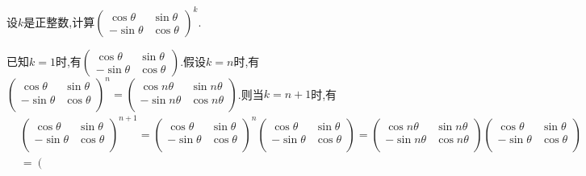 \documentclass[../../main.tex]{subfiles}
\begin{document}
\begin{exercise}
设\(k\)是正整数,计算\(\begin{pmatrix}
\cos\theta & \sin\theta\\
-\sin\theta & \cos\theta
\end{pmatrix}^k\).
\end{exercise}
\begin{solution}
已知$k=1$时,有\(\begin{pmatrix}
\cos\theta & \sin\theta\\
-\sin\theta & \cos\theta
\end{pmatrix}\).假设$k=n$时,有$\left( \begin{matrix}
\cos \theta&		\sin \theta\\
-\sin \theta&		\cos \theta\\
\end{matrix} \right) ^n=\left( \begin{matrix}
\cos n\theta&		\sin n\theta\\
-\sin n\theta&		\cos n\theta\\
\end{matrix} \right) $.则当$k=n+1$时,有
\begin{align*}
&\left( \begin{matrix}
\cos \theta&		\sin \theta\\
-\sin \theta&		\cos \theta\\
\end{matrix} \right) ^{n+1}=\left( \begin{matrix}
\cos \theta&		\sin \theta\\
-\sin \theta&		\cos \theta\\
\end{matrix} \right) ^n\left( \begin{matrix}
\cos \theta&		\sin \theta\\
-\sin \theta&		\cos \theta\\
\end{matrix} \right) =\left( \begin{matrix}
\cos n\theta&		\sin n\theta\\
-\sin n\theta&		\cos n\theta\\
\end{matrix} \right) \left( \begin{matrix}
\cos \theta&		\sin \theta\\
-\sin \theta&		\cos \theta\\
\end{matrix} \right) 
\\
&=\left( \begin{matrix}

\end{matrix}
\end{align*}
\end{solution}
\end{document}
